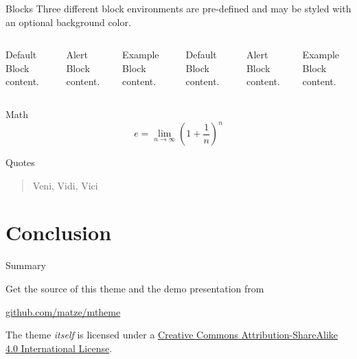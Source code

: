 \documentclass[10pt]{beamer}
\begin{document}
\begin{frame}{Blocks}
  Three different block environments are pre-defined and may be styled with an
  optional background color.

  \begin{columns}[T,onlytextwidth]
      \begin{block}{Default}
        Block content.
      \end{block}

      \begin{alertblock}{Alert}
        Block content.
      \end{alertblock}

      \begin{exampleblock}{Example}
        Block content.
      \end{exampleblock}



      \begin{block}{Default}
        Block content.
      \end{block}

      \begin{alertblock}{Alert}
        Block content.
      \end{alertblock}

      \begin{exampleblock}{Example}
        Block content.
      \end{exampleblock}

  \end{columns}
\end{frame}
\begin{frame}{Math}
  \begin{equation*}
    e = \lim_{n\to \infty} \left(1 + \frac{1}{n}\right)^n
  \end{equation*}
\end{frame}
\begin{frame}{Quotes}
  \begin{quote}
    Veni, Vidi, Vici
  \end{quote}
\end{frame}

\section{Conclusion}

\begin{frame}{Summary}

  Get the source of this theme and the demo presentation from

  \begin{center}\url{github.com/matze/mtheme}\end{center}

  The theme \emph{itself} is licensed under a
  \href{http://creativecommons.org/licenses/by-sa/4.0/}{Creative Commons
  Attribution-ShareAlike 4.0 International License}.

  \begin{center}\ccbysa\end{center}

\end{frame}
\end{document}
